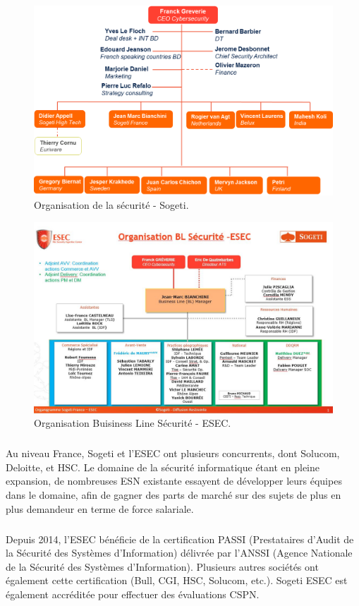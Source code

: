 \begin{figure}[h]
    \centering
    \includegraphics[scale=0.5]{images/organigramme.png}
    \caption{Organisation de la sécurité - Sogeti.}
\end{figure}
\begin{figure}[h]
    \centering
    \includegraphics[scale=0.5]{images/bl-esec-orga.png}
    \caption{Organisation Buisiness Line Sécurité - ESEC.}
\end{figure}

\subparagraph{}
Au niveau France, Sogeti et l'ESEC ont plusieurs concurrents, dont Solucom, Deloitte,
et HSC. Le domaine de la sécurité informatique étant en pleine expansion, de nombreuses ESN existante
essayent de développer leurs équipes dans le domaine, afin de gagner des parts de marché
sur des sujets de plus en plus demandeur en terme de force salariale.

\subparagraph{}
Depuis 2014, l'ESEC bénéficie de la certification PASSI (Prestataires d'Audit de la Sécurité
des Systèmes d'Information) délivrée par l'ANSSI (Agence Nationale de la Sécurité des Systèmes
d'Information). Plusieurs autres sociétés ont également cette certification (Bull, CGI, HSC, Solucom, etc.).
Sogeti ESEC est également accréditée pour effectuer des évaluations CSPN.

